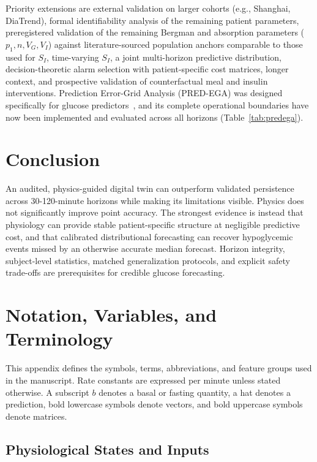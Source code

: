 \documentclass[journal]{IEEEtran}
\begin{document}
Priority extensions are external validation on larger cohorts (e.g., Shanghai, DiaTrend), formal identifiability analysis of the remaining patient parameters, preregistered validation of the remaining Bergman and absorption parameters ($p_1, n, V_G, V_I$) against literature-sourced population anchors comparable to those used for $S_I$, time-varying $S_I$, a joint multi-horizon predictive distribution, decision-theoretic alarm selection with patient-specific cost matrices, longer context, and prospective validation of counterfactual meal and insulin interventions. Prediction Error-Grid Analysis (PRED-EGA) was designed specifically for glucose predictors~\cite{ref53}, and its complete operational boundaries have now been implemented and evaluated across all horizons (Table~\ref{tab:predega}).

\section{Conclusion}

An audited, physics-guided digital twin can outperform validated persistence across 30-120-minute horizons while making its limitations visible. Physics does not significantly improve point accuracy. The strongest evidence is instead that physiology can provide stable patient-specific structure at negligible predictive cost, and that calibrated distributional forecasting can recover hypoglycemic events missed by an otherwise accurate median forecast. Horizon integrity, subject-level statistics, matched generalization protocols, and explicit safety trade-offs are prerequisites for credible glucose forecasting.

\appendices
\section{Notation, Variables, and Terminology}

This appendix defines the symbols, terms, abbreviations, and feature groups used in the manuscript. Rate constants are expressed per minute unless stated otherwise. A subscript $b$ denotes a basal or fasting quantity, a hat denotes a prediction, bold lowercase symbols denote vectors, and bold uppercase symbols denote matrices.

\subsection{Physiological States and Inputs}
\end{document}
